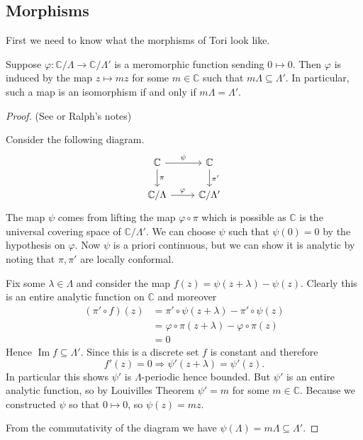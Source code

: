 \documentclass[11pt]{article}
\newcommand{\BB}[1]{\mathbb{#1}} %
\newcommand{\CC}{\BB{C}}
\newcommand{\im}{\operatorname{Im}}
\theoremstyle{plain}
\theoremstyle{remark}
\begin{document}
\subsection{Morphisms}

First we need to know what the morphisms of Tori look like.

\begin{thm}
	Suppose $\varphi:\CC/\Lambda \to \CC/\Lambda'$ is a meromorphic function sending $0\mapsto 0$. Then $\varphi$ is induced by the map $z\mapsto mz$ for some $m\in\CC$ such that $m\Lambda\subseteq \Lambda'$. In particular, such a map is an isomorphism if and only if $m\Lambda = \Lambda'$.
\end{thm}
\begin{proof}(See \cite[Chapter 1 Section 3]{diamondshurman} or Ralph's notes)
	\hfill

	Consider the following diagram.
	$$
	\begin{tikzcd}
		\CC \rar{\psi}\dar{\pi} & \CC\dar{\pi'}
		\\
		\CC/\Lambda \rar{\varphi} & \CC/\Lambda'
	\end{tikzcd}
	$$
	The map $\psi$ comes from lifting the map $\varphi\circ\pi$ which is possible as $\CC$ is the universal covering space of $\CC/\Lambda'$. We can choose $\psi$ such that $\psi(0)=0$ by the hypothesis on $\varphi$. Now $\psi$ is a priori continuous, but we can show it is analytic by noting that $\pi,\pi'$ are locally conformal.

	Fix some $\lambda\in\Lambda$ and consider the map $f(z) = \psi(z+\lambda) - \psi(z)$. Clearly this is an entire analytic function on $\CC$ and moreover
	\begin{align*}
		(\pi'\circ f)(z)
		&=
		\pi'\circ\psi(z+\lambda) - \pi'\circ\psi(z)
		\\
		&=
		\varphi\circ\pi(z+\lambda) - \varphi\circ\pi(z)
		\\
		&= 0
	\end{align*}
	Hence $\im f\subseteq \Lambda'$. Since this is a discrete set $f$ is constant and therefore
	$$
	f'(z) = 0 \Rightarrow \psi'(z+\lambda) = \psi'(z).
	$$
	In particular this shows $\psi'$ is $\Lambda$-periodic hence bounded. But $\psi'$ is an entire analytic function, so by Louivilles Theorem $\psi' = m$ for some $m\in\CC$. Because we constructed $\psi$ so that $0\mapsto 0$, so $\psi(z) = mz$.

	From the commutativity of the diagram we have $\psi(\Lambda) = m\Lambda\subseteq\Lambda'$.
\end{proof}
\end{document}
